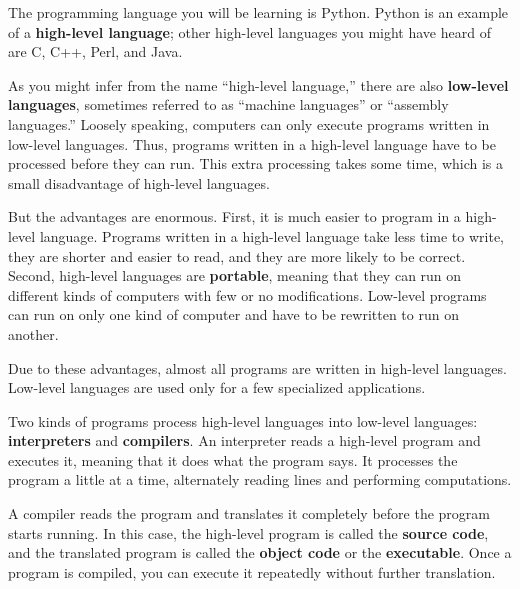 The programming language you will be learning is Python. Python is
an example of a {\bf high-level language}; other high-level languages
you might have heard of are C, C++, Perl, and Java.

As you might infer from the name ``high-level language,'' there are
also {\bf low-level languages}, sometimes referred to as ``machine
languages'' or ``assembly languages.''  Loosely speaking, computers
can only execute programs written in low-level languages.  Thus,
programs written in a high-level language have to be processed before
they can run.  This extra processing takes some time, which is a small
disadvantage of high-level languages.


But the advantages are enormous.  First, it is much easier to program
in a high-level language. Programs written in a high-level language
take less time to write, they are shorter and easier to read, and they
are more likely to be correct.  Second, high-level languages are {\bf
portable}, meaning that they can run on different kinds of computers
with few or no modifications.  Low-level programs can run on only one
kind of computer and have to be rewritten to run on another.

Due to these advantages, almost all programs are written in high-level
languages.  Low-level languages are used only for a few specialized
applications.


Two kinds of programs process high-level languages
into low-level languages: {\bf interpreters} and {\bf compilers}.
An interpreter reads a high-level program and executes it, meaning that it
does what the program says.  It processes the program a little at a time,
alternately reading lines and performing computations.

\beforefig
\centerline{}
\afterfig

A compiler reads the program and translates it completely before the
program starts running.  In this case, the high-level program is
called the {\bf source code}, and the translated program is called the
{\bf object code} or the {\bf executable}.  Once a program is
compiled, you can execute it repeatedly without further translation.

\beforefig
\centerline{}
\afterfig

